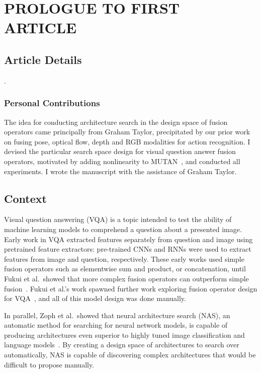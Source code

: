 \chapter{PROLOGUE TO FIRST ARTICLE}


\section{Article Details}

.

\subsection{Personal Contributions}

The idea for conducting architecture search in the design space of fusion
operators came principally from Graham Taylor, precipitated by our prior work
on fusing pose, optical flow, depth and RGB modalities for action recognition.
I devised the particular search space design for visual question answer fusion
operators, motivated by adding nonlinearity to MUTAN~\cite{ben2017mutan}, and
conducted all experiments.
I wrote the manuscript with the assistance of Graham Taylor.


\section{Context}

Visual question answering (VQA) is a topic intended to test the ability of
machine learning models to comprehend a question about a presented image.
Early work in VQA extracted features separately from question and image using
pretrained feature extractors: pre-trained CNNs and RNNs were used to extract
features from image and question, respectively.
These early works used simple fusion operators such as elementwise sum and
product, or concatenation, until Fukui et al.\ showed that more complex fusion
operators can outperform simple fusion~\cite{fukui2016multimodalCB}.
Fukui et al.'s work spawned further work exploring fusion operator design for
VQA~\cite{Kim2017, ben2017mutan}, and all of this model design was done
manually.

In parallel, Zoph et al.\ showed that neural architecture
search (NAS), an automatic method for searching for neural network models, is
capable of producing architectures even superior to highly tuned image
classification and language models~\cite{zoph2016neural}.
By creating a design space of architectures to search over automatically, NAS
is capable of discovering complex architectures that would be difficult to
propose manually.


